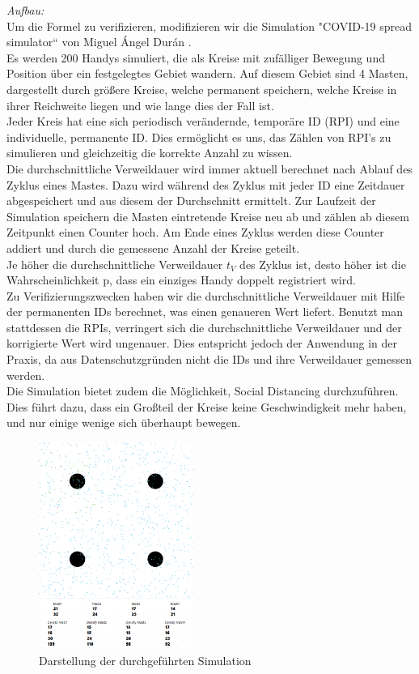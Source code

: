 \documentclass[conference]{IEEEtran}
\begin{document}
\textit{Aufbau:}\\
Um die Formel zu verifizieren, modifizieren wir die Simulation "COVID-19 spread simulator“ von Miguel Ángel Durán \cite{Simulation}.\\
Es werden 200 Handys simuliert, die als Kreise mit zufälliger Bewegung und Position über ein festgelegtes Gebiet wandern. Auf diesem Gebiet sind 4 Masten, dargestellt durch größere Kreise, welche permanent speichern, welche Kreise in ihrer Reichweite liegen und wie lange dies der Fall ist. \\
Jeder Kreis hat eine sich periodisch verändernde, temporäre ID (RPI) und eine individuelle, permanente ID. Dies ermöglicht es uns, das Zählen von RPI’s zu simulieren und gleichzeitig die korrekte Anzahl zu wissen.\\
Die durchschnittliche Verweildauer wird immer aktuell berechnet nach Ablauf des Zyklus eines Mastes. Dazu wird während des Zyklus mit jeder ID eine Zeitdauer abgespeichert und aus diesem der Durchschnitt ermittelt.  Zur Laufzeit der Simulation speichern die Masten eintretende Kreise neu ab und zählen ab diesem Zeitpunkt einen Counter hoch. Am Ende eines Zyklus werden diese Counter addiert und durch die gemessene Anzahl der Kreise geteilt.\\
Je höher die durchschnittliche Verweildauer $t_V$ des Zyklus ist, desto höher ist die Wahrscheinlichkeit p, dass ein einziges Handy doppelt registriert wird.\\
Zu Verifizierungszwecken haben wir die durchschnittliche Verweildauer mit Hilfe der permanenten IDs berechnet, was einen genaueren Wert liefert. Benutzt man stattdessen die RPIs, verringert sich die durchschnittliche Verweildauer und der korrigierte Wert wird ungenauer. Dies entspricht jedoch der Anwendung in der Praxis, da aus Datenschutzgründen nicht die IDs und ihre Verweildauer gemessen werden.\\
Die Simulation bietet zudem die Möglichkeit, Social Distancing durchzuführen. Dies führt dazu, dass ein Großteil der Kreise keine Geschwindigkeit mehr haben, und nur einige wenige sich überhaupt bewegen.\\

\begin{figure}[h]
	\centering
	\includegraphics[width=0.45\textwidth]{"Simulation"}
	\caption{Darstellung der durchgeführten Simulation}
\end{figure}
\end{document}
